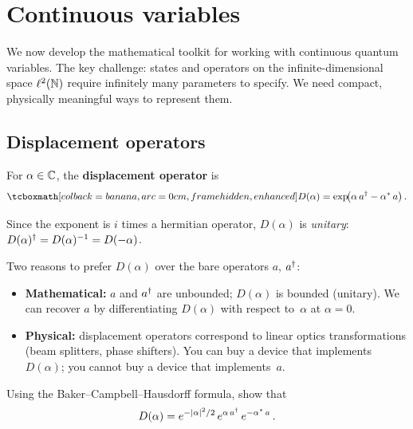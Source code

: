 \section{Continuous variables}\label{sec:continuous-variables}

We now develop the mathematical toolkit for working with continuous
quantum variables.  The key challenge: states and operators on the
infinite-dimensional space $\ell^2(\mathbb{N})$ require infinitely many
parameters to specify.  We need compact, physically meaningful ways
to represent them.

\subsection{Displacement operators}\label{sec:displacement}

\begin{definition}\label{def:displacement}
  For $\alpha \in \mathbb{C}$, the \textbf{displacement operator} is
  \begin{equation}\label{eq:displacement}
    \eqbox{D(\alpha) = \exp\!\bigl(\alpha\, a^\adj - \alpha^*\, a\bigr)}\,.
  \end{equation}
\end{definition}

Since the exponent is $i$ times a hermitian operator, $D(\alpha)$ is
\emph{unitary}: $D(\alpha)^\dagger = D(\alpha)^{-1} = D(-\alpha)$.

\begin{intuition}
  Two reasons to prefer $D(\alpha)$ over the bare operators $a$,
  $a^\dagger$:
  \begin{itemize}
    \item \textbf{Mathematical:} $a$ and $a^\dagger$ are unbounded; $D(\alpha)$
      is bounded (unitary).  We can recover $a$ by differentiating
      $D(\alpha)$ with respect to~$\alpha$ at $\alpha = 0$.
    \item \textbf{Physical:} displacement operators correspond to
      linear optics transformations (beam splitters, phase shifters).
      You can buy a device that implements $D(\alpha)$; you cannot
      buy a device that implements~$a$.
  \end{itemize}
\end{intuition}

\begin{exercise}\label{ex:bch-displacement}
  Using the Baker--Campbell--Hausdorff formula, show that
  \begin{equation}\label{eq:displacement-bch}
    D(\alpha)
    = e^{-\lvert\alpha\rvert^2/2}\, e^{\alpha\, a^\dagger}\,
      e^{-\alpha^*\, a}\,.
  \end{equation}
\end{exercise}

